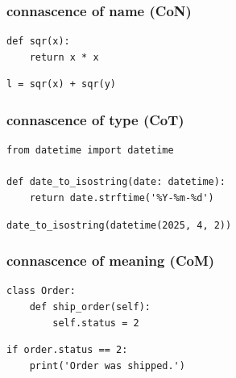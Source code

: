 \documentclass[aspectratio=169,12pt,xcolor=dvipsnames]{beamer}
\begin{document}
\begin{frame}[fragile]
  \frametitle{connascence of name (CoN)}
  \begin{center}
    \begin{minipage}[c]{.35\textwidth}
      \begin{verbatim}
def sqr(x):
    return x * x
      \end{verbatim}
    \end{minipage}
    \begin{minipage}[c]{.35\textwidth}
      \begin{verbatim}
l = sqr(x) + sqr(y)
      \end{verbatim}
    \end{minipage}
  \end{center}
\end{frame}

\begin{frame}[fragile]
  \frametitle{connascence of type (CoT)}
  \begin{center}
    \begin{minipage}[c]{.65\textwidth}
      \begin{verbatim}
from datetime import datetime

def date_to_isostring(date: datetime):
    return date.strftime('%Y-%m-%d')
      \end{verbatim}
    \end{minipage}
    \begin{minipage}[c]{.65\textwidth}
      \begin{verbatim}
date_to_isostring(datetime(2025, 4, 2))
      \end{verbatim}
    \end{minipage}
  \end{center}
\end{frame}

\begin{frame}[fragile]
  \frametitle{connascence of meaning (CoM)}
  \begin{center}
    \begin{minipage}[c]{.5\textwidth}
      \begin{verbatim}
class Order:
    def ship_order(self):
        self.status = 2
      \end{verbatim}
    \end{minipage}
    \begin{minipage}[c]{.5\textwidth}
      \begin{verbatim}
if order.status == 2:
    print('Order was shipped.')
      \end{verbatim}
    \end{minipage}
  \end{center}
\end{frame}
\end{document}
